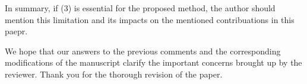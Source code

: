 \begin{reviewer}
In summary, if (3) is essential for the proposed method, the author should mention this limitation and its impacts on the mentioned contribuations in this paepr.
\end{reviewer}
\begin{authors}
We hope that our answers to the previous comments and the corresponding modifications of the manuscript clarify the important concerns brought up by the reviewer.
Thank you for the thorough revision of the paper.
\end{authors}
